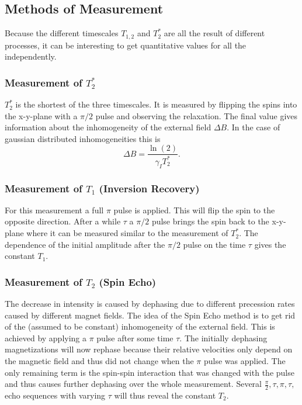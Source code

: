 \documentclass[a4paper]{scrartcl}
\numberwithin{equation}{section}
\numberwithin{figure}{section}
\numberwithin{table}{section}
\newcommand{\eq}[2]{\begin{equation}#1\label{#2}\end{equation}}
\begin{document}
\subsection{Methods of Measurement}
\label{sec:methods}
Because the different timescales $T_{1,2}$ and $T_2^*$ are all the result of different processes, it can be interesting to get quantitative values for all the independently.

\subsubsection*{Measurement of $T_2^*$}
$T_2^*$ is the shortest of the three timescales. It is measured by flipping the spins into the x-y-plane with a $\pi/2$ pulse and observing the relaxation. The final value gives information about the inhomogeneity of the external field ${\Delta B}$. In the case of gaussian distributed inhomogeneities this is
\eq{{\Delta B} = \frac{\ln(2)}{\gamma_I T_2^*} .}{}

\subsubsection*{Measurement of $T_1$ (Inversion Recovery)}
For this measurement a full $\pi$ pulse is applied. This will flip the spin to the opposite direction. After a while $\tau$ a $\pi/2$ pulse brings the spin back to the x-y-plane where it can be measured similar to the measurement of $T_2^*$. The dependence of the initial amplitude after the $\pi/2$ pulse on the time $\tau$ gives the constant $T_1$.

\subsubsection*{Measurement of $T_2$ (Spin Echo)}
The decrease in intensity is caused by dephasing due to different precession rates caused by different magnet fields. The idea of the Spin Echo method is to get rid of the (assumed to be constant) inhomogeneity of the external field. This is achieved by applying a $\pi$ pulse after some time $\tau$. The initially dephasing magnetizations will now rephase because their relative velocities only depend on the magnetic field and thus did not change when the $\pi$ pulse was applied. The only remaining term is the spin-spin interaction that was changed with the pulse and thus causes further dephasing over the whole measurement. Several $\frac{\pi}{2},\tau,\pi,\tau,$echo sequences with varying $\tau$ will thus reveal the constant $T_2$.
\end{document}
